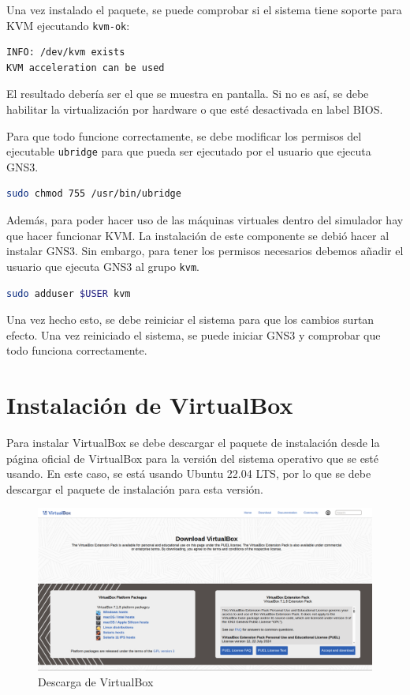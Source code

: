 \noindent
Una vez instalado el paquete, se puede comprobar si el sistema tiene soporte para KVM ejecutando \lstinline|kvm-ok|:

\begin{lstlisting}[language=bash]
INFO: /dev/kvm exists
KVM acceleration can be used
\end{lstlisting}

\noindent
El resultado debería ser el que se muestra en pantalla. Si no es así, se debe habilitar la virtualización por hardware o que esté desactivada en label BIOS. 

\vspace{1em}
\noindent
Para que todo funcione correctamente, se debe modificar los permisos del ejecutable \texttt{ubridge} para 
que pueda ser ejecutado por el usuario que ejecuta GNS3.

\begin{lstlisting}[language=bash]
sudo chmod 755 /usr/bin/ubridge
\end{lstlisting}

\noindent
Además, para poder hacer uso de las máquinas virtuales dentro del simulador hay que hacer funcionar KVM. La instalación de este componente se debió hacer al instalar GNS3.
Sin embargo, para tener los permisos necesarios debemos añadir el usuario que ejecuta GNS3 al grupo \texttt{kvm}.

\begin{lstlisting}[language=bash]
sudo adduser $USER kvm
\end{lstlisting}

\noindent
Una vez hecho esto, se debe reiniciar el sistema para que los cambios surtan efecto. Una vez reiniciado el sistema, se puede iniciar GNS3 y comprobar que todo funciona correctamente.

\section{Instalación de VirtualBox}
\label{Apendice1:instalacion_virtualbox}
Para instalar VirtualBox \cite{virtualbox} se debe descargar el paquete de instalación desde la página oficial de VirtualBox para la versión del sistema operativo que se esté usando. En este caso, se está usando Ubuntu 22.04 LTS, por lo que se debe descargar el paquete de instalación para esta versión.

\begin{figure}[H]
	\centering
	\includegraphics[width=1\textwidth]{images/virtualbox_download.png}
	\caption{Descarga de VirtualBox}
	\label{fig:virtualbox_download}
\end{figure}

